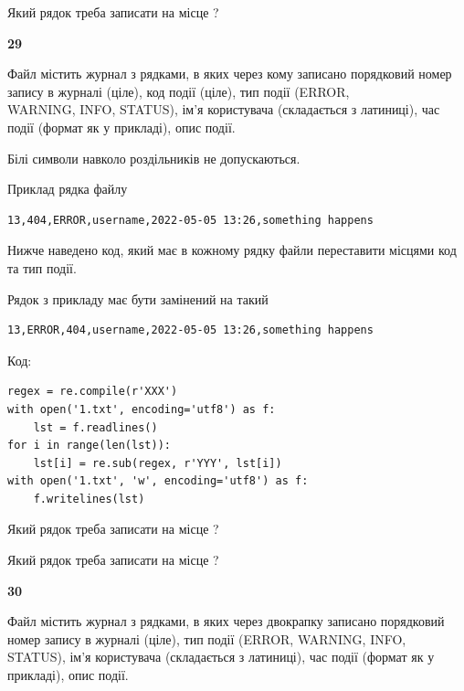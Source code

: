 Який рядок треба записати на місце  ?\par


\newpage

{\begin {center}\textbf{ 29}\end {center}}\par
Файл  містить журнал з рядками, в яких через кому записано поряд\-ко\-вий номер запису в журналі (ціле), код події (ціле), тип події (ERROR,\\ WARNING, INFO, STATUS), ім'я користувача (складається з латиниці), час події (фор\-мат як у прикладі), опис події.

Білі символи навколо роздільників не допускаються.

Приклад рядка файлу



\begin{verbatim}
13,404,ERROR,username,2022-05-05 13:26,something happens
\end{verbatim}


Нижче наведено код, який має в кожному рядку файли переставити місцями код та тип події.

Рядок з прикладу має бути замінений на такий



\begin{verbatim}
13,ERROR,404,username,2022-05-05 13:26,something happens
\end{verbatim}




Код:



\begin{verbatim}
regex = re.compile(r'XXX')
with open('1.txt', encoding='utf8') as f:
    lst = f.readlines()
for i in range(len(lst)):
    lst[i] = re.sub(regex, r'YYY', lst[i])
with open('1.txt', 'w', encoding='utf8') as f:
    f.writelines(lst)
\end{verbatim}







Який рядок треба записати на місце  ?\par
\vspace{5mm}


Який рядок треба записати на місце  ?\par


\newpage

{\begin {center}\textbf{ 30}\end {center}}\par
Файл  містить журнал з рядками, в яких через двокрапку записано поряд\-ко\-вий номер запису в журналі (ціле), тип події (ERROR, WARNING, INFO, STATUS), ім'я користувача (складається з латиниці), час події (фор\-мат як у прикладі), опис події.

